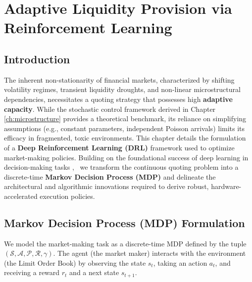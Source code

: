 \chapter{Adaptive Liquidity Provision via Reinforcement Learning}
\label{ch:rl_strategy}

\section{Introduction}
The inherent non-stationarity of financial markets, characterized by shifting volatility regimes, transient liquidity droughts, and non-linear microstructural dependencies, necessitates a quoting strategy that possesses high \textbf{adaptive capacity}. While the stochastic control framework derived in Chapter \ref{ch:microstructure} provides a theoretical benchmark, its reliance on simplifying assumptions (e.g., constant parameters, independent Poisson arrivals) limits its efficacy in fragmented, toxic environments.
 This chapter details the formulation of a \textbf{Deep Reinforcement Learning (DRL)} framework used to optimize market-making policies. Building on the foundational success of deep learning in decision-making tasks \citep{Mnih2015,Arulkumaran2017}, \datamethodology\ we transform the continuous quoting problem into a discrete-time \textbf{Markov Decision Process (MDP)} and delineate the architectural and algorithmic innovations required to derive robust, hardware-accelerated execution policies.

\section{Markov Decision Process (MDP) Formulation}
We model the market-making task as a discrete-time MDP defined by the tuple $(\mathcal{S}, \mathcal{A}, \mathcal{P}, \mathcal{R}, \gamma)$. The agent (the market maker) interacts with the environment (the Limit Order Book) by observing the state $s_t$, taking an action $a_t$, and receiving a reward $r_t$ and a next state $s_{t+1}$.

